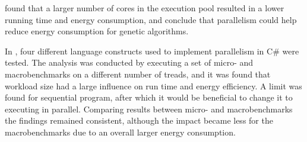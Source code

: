 
\cite{abdelhafez2019} found that a larger number of cores in the execution pool resulted in a lower running time and energy consumption, and conclude that parallelism could help reduce energy consumption for genetic algorithms. %

In \cite{Lindholt2022}, %
four different language constructs used to implement parallelism in C\# were tested. The analysis was conducted by executing a set of micro- and macrobenchmarks on a different number of treads, and it was found that workload size had a large influence on run time and energy efficiency. A limit was found for sequential program, after which it would be beneficial to change it to executing in parallel. Comparing results between micro- and macrobenchmarks the findings remained consistent, although the impact became less for the macrobenchmarks due to an overall larger energy consumption.%



